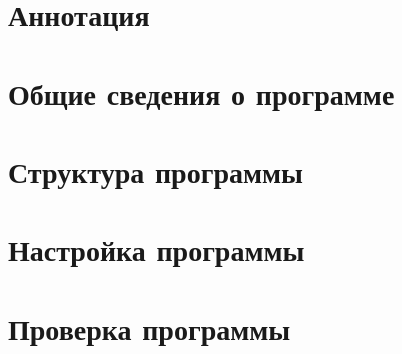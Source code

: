\documentclass[a4paper,11pt]{report}
\begin{document}


\chapter*{Аннотация}
	

\tableofcontents
\clearpage

\chapter{Общие сведения о программе}
	
\chapter{Структура программы}
	
\chapter{Настройка программы}
	
\chapter{Проверка программы}
	
\end{document}

